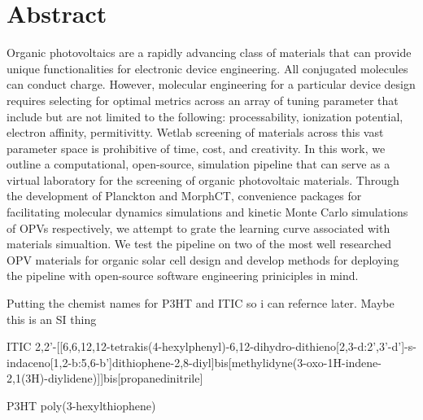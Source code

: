 
\chapter*{Abstract}

Organic photovoltaics are a rapidly advancing class of materials that can provide unique functionalities for
electronic device engineering.
All conjugated molecules can conduct charge. 
However, molecular engineering for a particular device design
requires selecting for optimal metrics across an array of tuning parameter that include but are
not limited to the following:
processability, ionization potential, electron affinity, permitivitty. 
Wetlab screening of materials across
this vast parameter space is prohibitive of time, cost, and creativity. 
In this work, we outline a computational, open-source, simulation pipeline that can serve as a 
virtual laboratory for the screening of organic photovoltaic materials. 
Through the development of Planckton and MorphCT, convenience packages for facilitating molecular dynamics
simulations and kinetic Monte Carlo simulations of OPVs respectively, we attempt to grate the learning curve
associated with materials simualtion. We test the pipeline on
two of the most well researched OPV materials for organic solar cell design and develop methods for deploying
the pipeline with open-source software engineering priniciples in mind.

Putting the chemist names for P3HT and ITIC so i can refernce later. Maybe this is an SI thing

ITIC
2,2'-[[6,6,12,12-tetrakis(4-hexylphenyl)-6,12-dihydro-dithieno[2,3-d:2',3'-d']-s-indaceno[1,2-b:5,6-b']dithiophene-2,8-diyl]bis[methylidyne(3-oxo-1H-indene-2,1(3H)-diylidene)]]bis[propanedinitrile]

P3HT poly(3-hexylthiophene)




